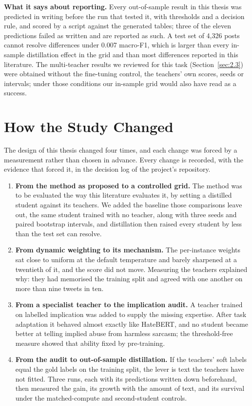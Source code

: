 \textbf{What it says about reporting.} Every out-of-sample result in this thesis was predicted in
writing before the run that tested it, with thresholds and a decision rule, and scored by a script
against the generated tables; three of the eleven predictions failed as written and are reported as
such. A test set of 4,326 posts cannot resolve differences under 0.007 macro-F1, which is larger
than every in-sample distillation effect in the grid and than most differences reported in this
literature. The multi-teacher results we reviewed for this task (Section~\ref{sec:2.3}) were
obtained without the fine-tuning control, the teachers' own scores, seeds or intervals; under those
conditions our in-sample grid would also have read as a success.

\section{How the Study Changed}
\label{sec:6.3}
The design of this thesis changed four times, and each change was forced by a measurement rather than
chosen in advance. Every change is recorded, with the evidence that forced it, in the decision log of
the project's repository.
\begin{enumerate}
  \item \textbf{From the method as proposed to a controlled grid.} The method was to be evaluated the
    way this literature evaluates it, by setting a distilled student against its teachers. We added the
    baseline those comparisons leave out, the same student trained with no teacher, along with three
    seeds and paired bootstrap intervals, and distillation then raised every student by less than the
    test set can resolve.
  \item \textbf{From dynamic weighting to its mechanism.} The per-instance weights sat close to uniform at
    the default temperature and barely sharpened at a twentieth of it, and the score did not move.
    Measuring the teachers explained why: they had memorised the training split and agreed with one
    another on more than nine tweets in ten.
  \item \textbf{From a specialist teacher to the implication audit.} A teacher trained on labelled
    implication was added to supply the missing expertise. After task adaptation it behaved almost exactly
    like HateBERT, and no student became better at telling implied abuse from harmless sarcasm; the
    threshold-free measure showed that ability fixed by pre-training.
  \item \textbf{From the audit to out-of-sample distillation.} If the teachers' soft labels equal the gold
    labels on the training split, the lever is text the teachers have not fitted. Three runs, each with
    its predictions written down beforehand, then measured the gain, its growth with the amount of text,
    and its survival under the matched-compute and second-student controls.
\end{enumerate}
